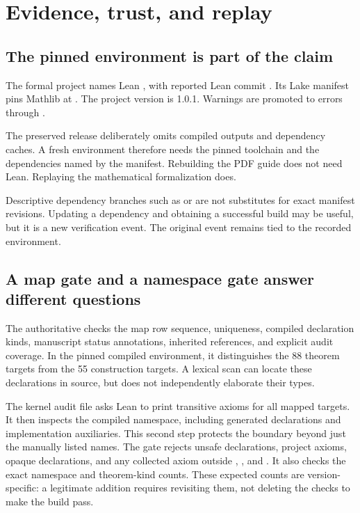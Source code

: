 \clearpage
\section{Evidence, trust, and replay}
\subsection{The pinned environment is part of the claim}
The formal project names Lean , with reported Lean commit . Its Lake manifest pins Mathlib at . The project version is 1.0.1. Warnings are promoted to errors through .

The preserved release deliberately omits compiled outputs and dependency caches. A fresh environment therefore needs the pinned toolchain and the dependencies named by the manifest. Rebuilding the PDF guide does not need Lean. Replaying the mathematical formalization does.

Descriptive dependency branches such as  or  are not substitutes for exact manifest revisions. Updating a dependency and obtaining a successful build may be useful, but it is a new verification event. The original event remains tied to the recorded environment.

\subsection{A map gate and a namespace gate answer different questions}
The authoritative  checks the map row sequence, uniqueness, compiled declaration kinds, manuscript status annotations, inherited references, and explicit audit coverage. In the pinned compiled environment, it distinguishes the 88 theorem targets from the 55 construction targets. A lexical scan can locate these declarations in source, but does not independently elaborate their types.

The kernel audit file asks Lean to print transitive axioms for all mapped targets. It then inspects the compiled  namespace, including generated declarations and implementation auxiliaries. This second step protects the boundary beyond just the manually listed names.
The gate rejects unsafe declarations, project axioms, opaque declarations, and any collected axiom outside , , and . It also checks the exact namespace and theorem-kind counts. These expected counts are version-specific: a legitimate addition requires revisiting them, not deleting the checks to make the build pass.

